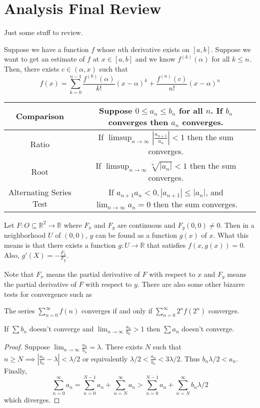 \documentclass{article}
\newcommand{\R}{\mathbb{R}}
\newcommand{\ra}[1][]{\xrightarrow{#1}}
\begin{document}
\section{Analysis Final Review}
Just some stuff to review.
\begin{theorem}
  Suppose we have a function $f$ whose $n$th derivative exists on $[a,b]$. Suppose we want to get an estimate of $f$ at $x\in[a,b]$ and we know $f^{(k)}(\alpha)$ for all $k\leq n$. Then, there exists $c\in(\alpha,x)$ such that
  $$f(x)=\sum_{k=0}^{n-1}\frac{f^{(k)}(\alpha)}{k!}(x-\alpha)^k+\frac{f^{(n)}(c)}{n!}(x-\alpha)^n$$
\end{theorem}
\begin{tabular}{|c|c|}
\hline
Comparison & Suppose $0\leq a_n\leq b_n$ for all $n$. If $b_n$ converges then $a_n$ converges. \\
\hline
Ratio & If $\limsup_{n\ra\infty}|\frac{a_{n+1}}{a_n}|<1$ then the sum converges.\\
\hline
Root & If $\limsup_{n\ra\infty}\sqrt[n]{|a_n|}<1$ then the sum converges.\\
\hline
Alternating Series Test & If $a_{n+1}a_n<0,|a_{n+1}|\leq|a_n|$, and $\lim_{n\ra\infty}a_n=0$ then the sum converges. \\
\hline
\end{tabular}
\begin{theorem}
Let $F:O\subseteq \R^2\ra\R$ where $F_x$ and $F_y$ are continuous and $F_y(0,0)\neq 0$. Then in a neighborhood $U$ of $(0,0)$, $y$ can be found as a function $g(x)$ of $x$. What this means is that there exists a function $g:U\ra \R$ that satisfies $f(x,g(x))=0$. Also, $g'(X)=-\frac{F_x}{F_y}$.
\end{theorem}
Note that $F_x$ means the partial derivative of $F$ with respect to $x$ and $F_y$ means the partial derivative of $F$ with respect to $y$. There are also some other bizarre tests for convergence such as
\begin{theorem}
  The series $\sum_{n=0}^\infty f(n)$ converges if and only if $\sum_{n=0}^\infty 2^nf(2^n)$ converges.
\end{theorem}
\begin{theorem}
  If $\sum b_n$ doesn't converge and $\lim_{n\to\infty}\frac{a_n}{b_n}>1$ then $\sum a_n$ doesn't converge.
\end{theorem}
\begin{proof}
  Suppose $\lim_{n\to\infty}\frac{a_n}{b_n}=\lambda$. There exists $N$ such that $n\geq N\implies |\frac{a_n}{b_n}-\lambda|<\lambda/2$ or equivalently $\lambda/2<\frac{a_n}{b_n}<3\lambda/2$. Thus $b_n\lambda/2<a_n$. Finally,
  $$\sum_{n=0}^\infty a_n=\sum_{n=0}^{N-1}a_n+\sum_{n=N}^\infty a_n>\sum_{n=0}^{N-1}a_n+\sum_{n=N}^\infty b_n\lambda/2$$ which diverges.
\end{proof}
\end{document}
